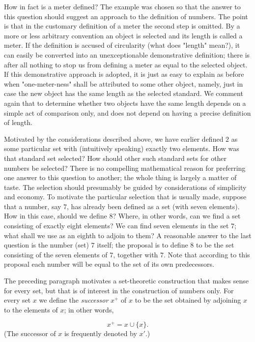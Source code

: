 How in fact is a meter defined? The example was chosen so that the answer to this question should suggest an approach to the definition of numbers. The point is that in the customary definition of a meter the second step is omitted. By a more or less arbitrary convention an object is selected and its length is called a meter. If the definition is accused of circularity (what does "length" mean?), it can easily be converted into an unexceptionable demonstrative definition; there is after all nothing to stop us from defining a meter as equal to the selected object. If this demonstrative approach is adopted, it is just as easy to explain as before when "one-meter-ness" shall be attributed to some other object, namely, just in case the new object has the same length as the selected standard. We comment again that to determine whether two objects have the same length depends on a simple act of comparison only, and does not depend on having a precise definition of length. 

Motivated by the considerations described above, we have earlier defined $2$ as some particular set with (intuitively speaking) exactly two elements. How was that standard set selected? How should other such standard sets for other numbers be selected? There is no compelling mathematical reason for preferring one answer to this question to another; the whole thing is largely a matter of taste. The selection should presumably be guided by considerations of simplicity and economy. To motivate the particular selection that is usually made, suppose that a number, say $7$, has already been defined as a set (with seven elements). How in this case, should we define $8$? Where, in other words, can we find a set consisting of exactly eight elements? We can find seven elements in the set $7$; what shall we use as an eighth to adjoin to them? A reasonable answer to the last question is the number (set) $7$ itself; the proposal is to define $8$ to be the set consisting of the seven elements of $7$, together with $7$. Note that according to this proposal each number will be equal to the set of its own predecessors. 

The preceding paragraph motivates a set-theoretic construction that makes sense for every set, but that is of interest in the construction of numbers only. For every set $x$ we define the \textit{successor} $x^{+}$ of $x$ to be the set obtained by adjoining $x$ to the elements of $x$; in other words,

\begin{equation*}
x^{+} = x \cup \{ x \}.
\end{equation*}
(The successor of $x$ is frequently denoted by $x'$.) 

